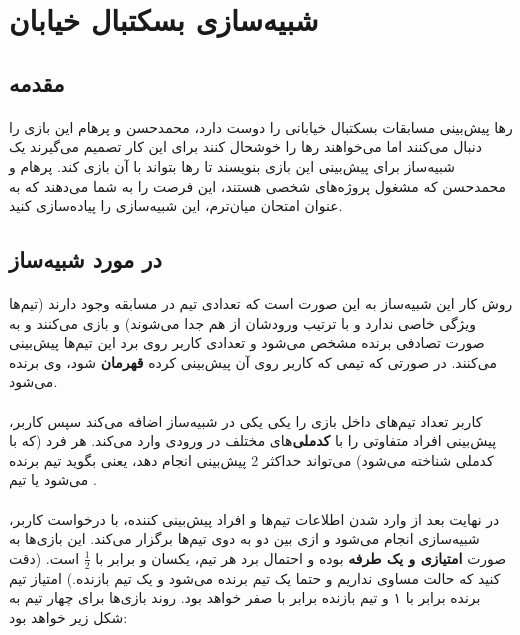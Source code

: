 \documentclass[../main.tex]{subfiles}
\begin{document}
\section{شبیه‌سازی بسکتبال خیابان}

\subsection{مقدمه}
\paragraph{}
رها پیش‌بینی مسابقات بسکتبال خیابانی را دوست دارد، محمدحسن و پرهام این بازی را دنبال می‌کنند اما می‌خواهند رها را خوشحال کنند
برای این کار تصمیم می‌گیرند یک شبیه‌ساز برای پیش‌بینی‌ این بازی بنویسند تا رها بتواند با آن بازی کند.
پرهام و محمدحسن که مشغول پروژه‌های شخصی هستند، این فرصت را به شما می‌دهند که به عنوان امتحان میان‌ترم، این شبیه‌سازی را پیاده‌سازی کنید.

\subsection{در مورد شبیه‌ساز}
\paragraph{}
روش کار این شبیه‌ساز به این صورت است که تعدادی تیم در مسابقه وجود دارند (تیم‌ها ویژگی خاصی ندارد و با ترتیب ورودشان از هم جدا می‌شوند) 
و بازی می‌کنند و به صورت تصادفی برنده مشخص می‌شود و تعدادی کاربر روی برد این تیم‌ها پیش‌بینی می‌کنند.
در صورتی که تیمی که کاربر روی آن پیش‌بینی کرده \textbf{قهرمان} شود، وی برنده می‌شود.

\paragraph{}
کاربر تعداد تیم‌های داخل بازی را یکی یکی در شبیه‌ساز اضافه می‌کند
سپس کاربر، پیش‌بینی افراد متفاوتی را با \textbf{کدملی}‌های مختلف در ورودی وارد می‌کند.
هر فرد (که با کدملی شناخته می‌شود) می‌تواند حداکثر 2 پیش‌بینی انجام دهد،
یعنی بگوید تیم  برنده می‌شود یا تیم .

\paragraph{}
در نهایت بعد از وارد شدن اطلاعات تیم‌ها و  افراد پیش‌بینی کننده، با درخواست کاربر، شبیه‌سازی انجام می‌شود و
ازی بین دو به دوی تیم‌ها برگزار می‌کند.
این بازی‌ها به صورت
\textbf{امتیازی و یک طرفه}
بوده و احتمال برد هر تیم‌، یکسان و برابر با
\(\frac{1}{2}\)
است. 
(دقت کنید که حالت مساوی نداریم و حتما یک تیم برنده می‌شود و یک تیم بازنده.)
امتیاز تیم برنده برابر با ۱ و تیم بازنده برابر با صفر خواهد بود.
روند بازی‌ها برای چهار تیم به شکل زیر خواهد بود:
\end{document}
